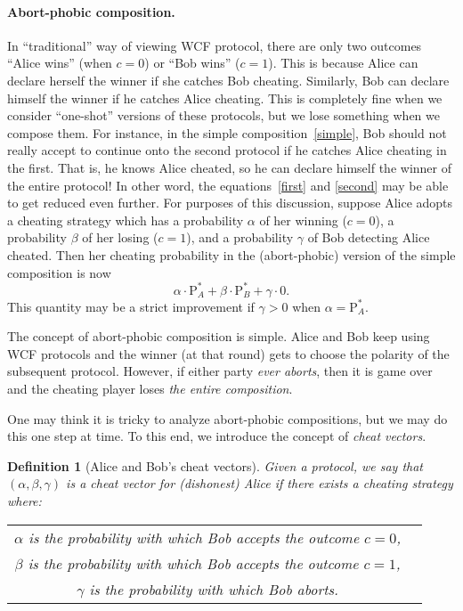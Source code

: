 \documentclass[11pt]{article}
\newtheorem{definition}{Definition}
\newcommand{\PB}{\mathrm{P}_B^*}
\newcommand{\PA}{\mathrm{P}_A^*}
\begin{document}

\paragraph{Abort-phobic composition.} 
In ``traditional'' way of viewing WCF protocol, there are only two outcomes ``Alice wins'' (when $c = 0$) or ``Bob wins'' ($c = 1$). 
This is because Alice can declare herself the winner if she catches Bob cheating. 
Similarly, Bob can declare himself the winner if he catches Alice cheating. 
This is completely fine when we consider ``one-shot'' versions of these protocols, but we lose something when we compose them. 
For instance, in the simple composition~\ref{simple}, Bob should not really accept to continue onto the second protocol if he catches Alice cheating in the first. 
That is, he knows Alice cheated, so he can declare himself the winner of the entire protocol! 
In other word, the equations~\ref{first} and \ref{second} may be able to get reduced even further. 
For purposes of this discussion, suppose Alice adopts a cheating strategy which has a probability $\alpha$ of her winning ($c = 0$), a probability $\beta$ of her losing ($c = 1$), and a probability $\gamma$ of Bob detecting Alice cheated. 
Then her cheating probability in the (abort-phobic) version of the simple composition is now 
\begin{equation} 
\alpha \cdot \PA + \beta \cdot \PB + \gamma \cdot 0. 
\end{equation} 
This quantity may be a strict improvement if $\gamma > 0$ when $\alpha = \PA$.  

The concept of abort-phobic composition is simple. 
Alice and Bob keep using WCF protocols and the winner (at that round) gets to choose the polarity of the subsequent protocol. 
However, if either party \emph{ever aborts}, then it is game over and the cheating player loses \emph{the entire composition}. 

One may think it is tricky to analyze abort-phobic compositions, but we may do this one step at time. 
To this end, we introduce the concept of \emph{cheat vectors}. 

\begin{definition}[Alice and Bob's cheat vectors]  
Given a protocol, we say that $(\alpha, \beta, \gamma)$ is a cheat vector for (dishonest) Alice if there exists a cheating strategy where: 
\begin{center} 
\begin{tabularx}{\textwidth}{cX}
$\alpha$ is the probability with which Bob accepts the outcome $c = 0$, \\ 
$\beta$ is the probability with which Bob accepts the outcome $c = 1$, \\ 
$\gamma$ is the probability with which Bob aborts. \\ \end{tabularx} 
\end{center}  
\end{definition} 
\end{document}
